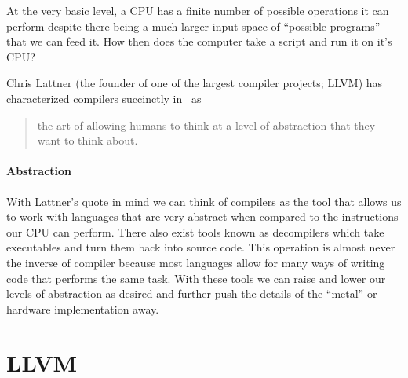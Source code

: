 At the very basic level, a \ac{CPU} has a finite number of possible operations it can perform despite there being a much larger input space of ``possible programs'' that we can feed it.
How then does the computer take a script and run it on it's CPU?


Chris Lattner (the founder of one of the largest compiler projects; LLVM) has characterized compilers succinctly in~\cite{lattnerquote} as
\begin{quote}
    the art of allowing humans to think at a level of abstraction that they want to think about.
\end{quote}

\paragraph{Abstraction} With Lattner's quote in mind we can think of compilers as the tool that allows us to work with languages that are very abstract when compared to the instructions our \ac{CPU} can perform.
There also exist tools known as decompilers which take executables and turn them back into source code.
This operation is almost never the inverse of compiler because most languages allow for many ways of writing code that performs the same task.
With these tools we can raise and lower our levels of abstraction as desired and further push the details of the ``metal'' or hardware implementation away.


\section{LLVM}

